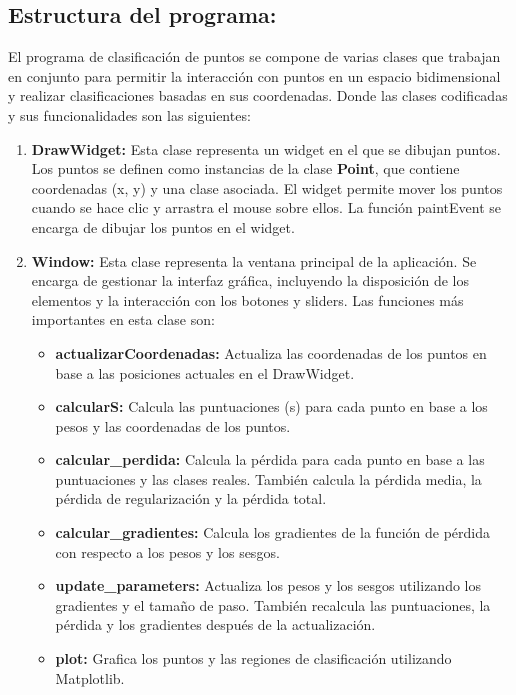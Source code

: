 \documentclass[twoside,10pt]{article}
\numberwithin{equation}{section}
\begin{document}
\subsection{Estructura del programa:}
El programa de clasificación de puntos se compone de varias clases que trabajan en conjunto para permitir la interacción con puntos en un espacio bidimensional y realizar clasificaciones basadas en sus coordenadas. Donde las clases codificadas y sus funcionalidades son las siguientes:
\begin{enumerate}
    \item \textbf{DrawWidget:} Esta clase representa un widget en el que se dibujan puntos. Los puntos se definen como instancias de la clase \textbf{Point}, que contiene coordenadas (x, y) y una clase asociada. El widget permite mover los puntos cuando se hace clic y arrastra el mouse sobre ellos. La función paintEvent se encarga de dibujar los puntos en el widget.
    \item \textbf{Window:} Esta clase representa la ventana principal de la aplicación. Se encarga de gestionar la interfaz gráfica, incluyendo la disposición de los elementos y la interacción con los botones y sliders. Las funciones más importantes en esta clase son:
    \begin{itemize}
        \item \textbf{actualizarCoordenadas:} Actualiza las coordenadas de los puntos en base a las posiciones actuales en el DrawWidget.
        \item \textbf{calcularS:} Calcula las puntuaciones (s) para cada punto en base a los pesos y las coordenadas de los puntos.
        \item \textbf{calcular\_perdida:} Calcula la pérdida para cada punto en base a las puntuaciones y las clases reales. También calcula la pérdida media, la pérdida de regularización y la pérdida total.
        \item \textbf{calcular\_gradientes:} Calcula los gradientes de la función de pérdida con respecto a los pesos y los sesgos.
        \item \textbf{update\_parameters:} Actualiza los pesos y los sesgos utilizando los gradientes y el tamaño de paso. También recalcula las puntuaciones, la pérdida y los gradientes después de la actualización.
        \item \textbf{plot:} Grafica los puntos y las regiones de clasificación utilizando Matplotlib.
    \end{itemize}
\end{enumerate}
\end{document}

